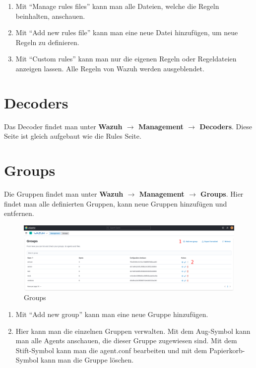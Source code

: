 \begin{enumerate}
    \item Mit ``Manage rules files'' kann man alle Dateien, welche die Regeln beinhalten, anschauen. 
    \item Mit ``Add new rules file'' kann man eine neue Datei hinzufügen, um neue Regeln zu definieren.
    \item Mit ``Custom rules'' kann man nur die eigenen Regeln oder Regeldateien anzeigen lassen. Alle Regeln von Wazuh werden ausgeblendet.
\end{enumerate}

\section{Decoders}
Das Decoder findet man unter \textbf{Wazuh $\rightarrow$ Management $\rightarrow$ Decoders}.
Diese Seite ist gleich aufgebaut wie die Rules Seite.

\section{Groups}
Die Gruppen findet man unter \textbf{Wazuh $\rightarrow$ Management $\rightarrow$ Groups}.
Hier findet man alle definierten Gruppen, kann neue Gruppen hinzufügen und entfernen.

\begin{figure}[H]
    \centering
    \includegraphics[width=\linewidth]{../img/wazuh-groups.png}
    \caption{Groups}
\end{figure}

\begin{enumerate}
    \item Mit ``Add new group'' kann man eine neue Gruppe hinzufügen.
    \item Hier kann man die einzelnen Gruppen verwalten. Mit dem Aug-Symbol kann man alle Agents anschauen, die dieser Gruppe zugewiesen sind. Mit dem Stift-Symbol kann man die agent.conf bearbeiten und mit dem Papierkorb-Symbol kann man die Gruppe löschen. 
\end{enumerate}

